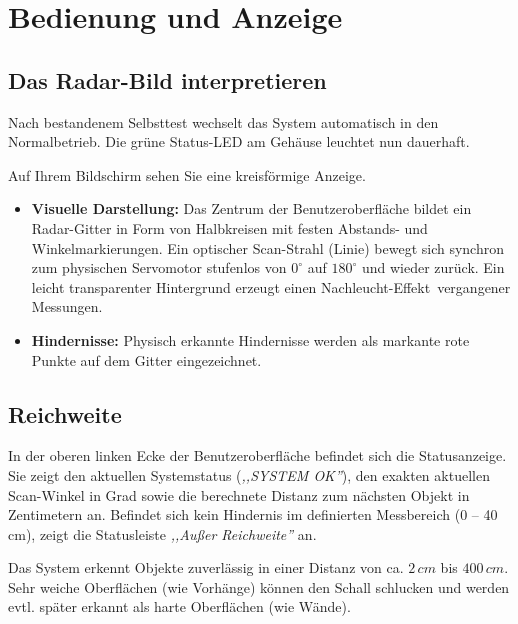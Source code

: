 %
%

\chapter{Bedienung und Anzeige}

\section{Das Radar-Bild interpretieren}
Nach bestandenem Selbsttest wechselt das System automatisch in den Normalbetrieb. Die grüne Status-LED am Gehäuse leuchtet nun dauerhaft.

Auf Ihrem Bildschirm sehen Sie eine kreisförmige Anzeige.

\begin{itemize}
	\item \textbf{Visuelle Darstellung:} Das Zentrum der Benutzeroberfläche bildet ein Radar-Gitter in Form von Halbkreisen mit festen Abstands- und Winkelmarkierungen. Ein optischer Scan-Strahl (Linie) bewegt sich synchron zum physischen Servomotor stufenlos von $0^\circ$ auf $180^\circ$ und wieder zurück. Ein leicht transparenter Hintergrund erzeugt einen \glqq Nachleucht-Effekt\grqq~vergangener Messungen.
	\item \textbf{Hindernisse:} Physisch erkannte Hindernisse werden als markante rote Punkte auf dem Gitter eingezeichnet.
\end{itemize}

\section{Reichweite}
In der oberen linken Ecke der Benutzeroberfläche befindet sich die Statusanzeige. Sie zeigt den aktuellen Systemstatus (\textit{,,SYSTEM OK''}), den exakten aktuellen Scan-Winkel in Grad sowie die berechnete Distanz zum nächsten Objekt in Zentimetern an. Befindet sich kein Hindernis im definierten Messbereich (0 -- 40\,cm), zeigt die Statusleiste \textit{,,Außer Reichweite''} an.

Das System erkennt Objekte zuverlässig in einer Distanz von ca. $2\,cm$ bis $400\,cm$. Sehr weiche Oberflächen (wie Vorhänge) können den Schall schlucken und werden evtl. später erkannt als harte Oberflächen (wie Wände).
